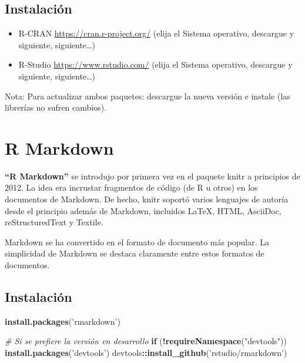 \documentclass[
]{book}
\newenvironment{Shaded}{\begin{snugshade}}{\end{snugshade}}
\newcommand{\CommentTok}[1]{\textcolor[rgb]{0.56,0.35,0.01}{\textit{#1}}}
\newcommand{\ControlFlowTok}[1]{\textcolor[rgb]{0.13,0.29,0.53}{\textbf{#1}}}
\newcommand{\KeywordTok}[1]{\textcolor[rgb]{0.13,0.29,0.53}{\textbf{#1}}}
\newcommand{\NormalTok}[1]{#1}
\newcommand{\OperatorTok}[1]{\textcolor[rgb]{0.81,0.36,0.00}{\textbf{#1}}}
\newcommand{\StringTok}[1]{\textcolor[rgb]{0.31,0.60,0.02}{#1}}
\providecommand{\tightlist}{%
  \setlength{\itemsep}{0pt}\setlength{\parskip}{0pt}}
\begin{document}
\hypertarget{instalaciuxf3n}{%
\subsection{Instalación}\label{instalaciuxf3n}}

\begin{itemize}
\tightlist
\item
  R-CRAN \url{https://cran.r-project.org/} (elija el Sistema operativo, descargue y siguiente, siguiente\ldots)
\item
  R-Studio \url{https://www.rstudio.com/} (elija el Sistema operativo, descargue y siguiente, siguiente\ldots)
\end{itemize}

Nota: Para actualizar ambos paquetes: descargue la nueva versión e instale (las librerías no sufren cambios).

\hypertarget{r-markdown}{%
\section{R Markdown}\label{r-markdown}}

\textbf{``R Markdown''} se introdujo por primera vez en el paquete knitr a principios de 2012. La idea era incrustar fragmentos de código (de R u otros) en los documentos de Markdown. De hecho, knitr soportó varios lenguajes de autoría desde el principio además de Markdown, incluidos LaTeX, HTML, AsciiDoc, reStructuredText y Textile.

Markdown se ha convertido en el formato de documento más popular. La simplicidad de Markdown se destaca claramente entre estos formatos de documentos.

\hypertarget{instalaciuxf3n-1}{%
\subsection{Instalación}\label{instalaciuxf3n-1}}

\begin{Shaded}
\begin{Highlighting}[]
\KeywordTok{install.packages}\NormalTok{(}\StringTok{'rmarkdown'}\NormalTok{)}

\CommentTok{# Si se prefiere la versión en desarrollo}
\ControlFlowTok{if}\NormalTok{ (}\OperatorTok{!}\KeywordTok{requireNamespace}\NormalTok{(}\StringTok{"devtools"}\NormalTok{))}
  \KeywordTok{install.packages}\NormalTok{(}\StringTok{'devtools'}\NormalTok{)}
\NormalTok{devtools}\OperatorTok{::}\KeywordTok{install_github}\NormalTok{(}\StringTok{'rstudio/rmarkdown'}\NormalTok{)}
\end{Highlighting}
\end{Shaded}
\end{document}
